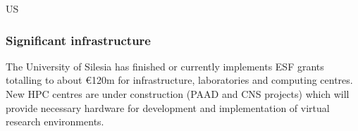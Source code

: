 \begin{sitedescription}{US}
\subsubsection*{Significant infrastructure}

The University of Silesia has finished or currently implements ESF grants
totalling to about \euro 120m for infrastructure, laboratories and
computing centres. New HPC centres are under construction (PAAD and
CNS projects) which will provide necessary hardware for development
and implementation of virtual research environments.
\end{sitedescription}





